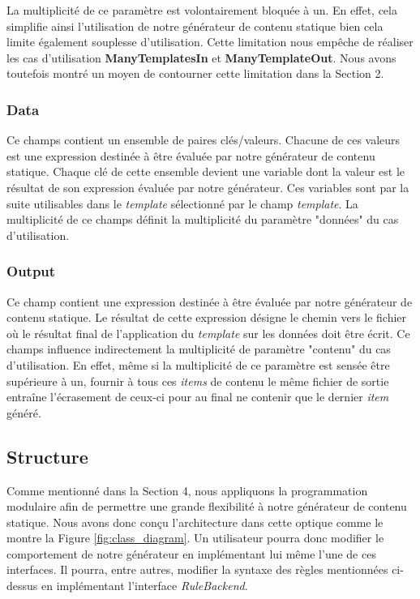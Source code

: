			La multiplicité de ce paramètre est volontairement bloquée à un. En effet, cela simplifie ainsi l'utilisation de notre générateur de contenu statique bien cela limite également souplesse d'utilisation. Cette limitation nous empêche de réaliser les cas d'utilisation \textbf{ManyTemplatesIn} et \textbf{ManyTemplateOut}. Nous avons toutefois montré un moyen de contourner cette limitation dans la Section 2.
		
		\subsubsection*{Data}
			Ce champs contient un ensemble de paires clés/valeurs. Chacune de ces valeurs est une expression destinée à être évaluée par notre générateur de contenu statique. Chaque clé de cette ensemble devient une variable dont la valeur est le résultat de son expression évaluée par notre générateur. Ces variables sont par la suite utilisables dans le \textit{template} sélectionné par le champ \textit{template}. La multiplicité de ce champs définit la multiplicité du paramètre "données" du cas d'utilisation. 
		
		\subsubsection*{Output}
			Ce champ contient une expression destinée à être évaluée par notre générateur de contenu statique. Le résultat de cette expression désigne le chemin vers le fichier où le résultat final de l'application du \textit{template} sur les données doit être écrit. Ce champs influence indirectement la multiplicité de paramètre "contenu" du cas d'utilisation. En effet, même si la multiplicité de ce paramètre est sensée être supérieure à un, fournir à tous ces \textit{items} de contenu le même fichier de sortie entraîne l'écrasement de ceux-ci pour au final ne contenir que le dernier \textit{item} généré.
	
	
	\subsection{Structure}
		Comme mentionné dans la Section 4, nous appliquons la programmation modulaire afin de permettre une grande flexibilité à notre générateur de contenu statique. Nous avons donc conçu l'architecture dans cette optique comme le montre la Figure \ref{fig:class_diagram}. Un utilisateur pourra donc modifier le comportement de notre générateur en implémentant lui même l'une de ces interfaces. Il pourra, entre autres, modifier la syntaxe des règles mentionnées ci-dessus en implémentant l'interface \textit{RuleBackend}.
		
